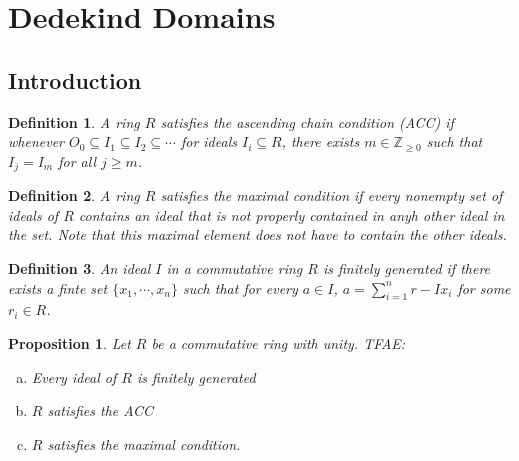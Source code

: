 \documentclass{article}
\newcommand{\Z}{\mathbb{Z}}
\newtheorem{proposition}{Proposition}[subsection]
\newtheorem{definition}{Definition}[subsection]
\begin{document}
      \section{Dedekind Domains}
      \subsection{Introduction}
      \begin{definition}
      A ring $R$ satisfies the ascending chain condition (ACC) if whenever $O_0\subseteq I_1\subseteq I_2\subseteq\cdots$ for ideals $I_i\subseteq R$, there exists $m\in\Z_{\geq 0}$ such that $I_j=I_m$ for all $j\geq m$.
      \end{definition}
      \begin{definition}
      A ring $R$ satisfies the maximal condition if every nonempty set of ideals of $R$ contains an ideal that is not properly contained in anyh other ideal in the set. Note that this maximal element does not have to contain the other ideals.
      \end{definition}
      \begin{definition}
      An ideal $I$ in a commutative ring $R$ is finitely generated if there exists a finte set $\{x_1,\cdots, x_n\}$ such that for every $a\in I$, $a=\displaystyle\sum_{i=1}^nr-Ix_i$ for some $r_i\in R$. 
      \end{definition}
      \begin{proposition}
      Let $R$ be a commutative ring with unity. TFAE:
      \begin{enumerate}[(a)]
          \item Every ideal of $R$ is finitely generated
          \item $R$ satisfies the ACC
          \item $R$ satisfies the maximal condition.
      \end{enumerate}
      \end{proposition}
\end{document}
